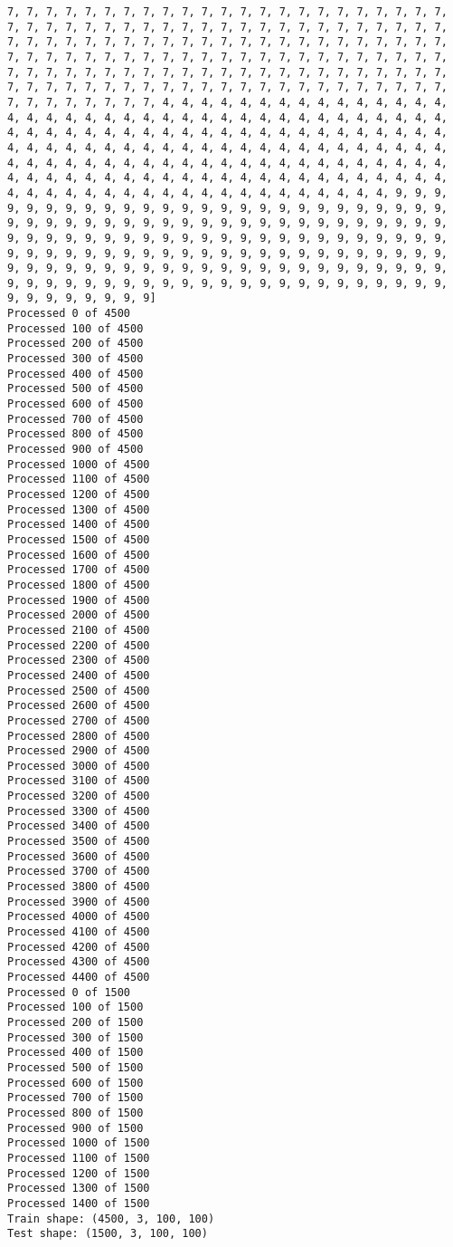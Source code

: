 \documentclass[11pt]{article}
\begin{document}
\begin{Verbatim}[commandchars=\\\{\}]
7, 7, 7, 7, 7, 7, 7, 7, 7, 7, 7, 7, 7, 7, 7, 7, 7, 7, 7, 7, 7, 7, 7, 7, 7, 7, 7, 7, 7, 7, 7, 7, 7, 7, 7, 7, 7, 7, 7, 7, 7, 7, 7, 7, 7, 7, 7, 7, 7, 7, 7, 7, 7, 7, 7, 7, 7, 7, 7, 7, 7, 7, 7, 7, 7, 7, 7, 7, 7, 7, 7, 7, 7, 7, 7, 7, 7, 7, 7, 7, 7, 7, 7, 7, 7, 7, 7, 7, 7, 7, 7, 7, 7, 7, 7, 7, 7, 7, 7, 7, 7, 7, 7, 7, 7, 7, 7, 7, 7, 7, 7, 7, 7, 7, 7, 7, 7, 7, 7, 7, 7, 7, 7, 7, 7, 7, 7, 7, 7, 7, 7, 7, 7, 7, 7, 7, 7, 7, 7, 7, 7, 7, 7, 7, 7, 7, 4, 4, 4, 4, 4, 4, 4, 4, 4, 4, 4, 4, 4, 4, 4, 4, 4, 4, 4, 4, 4, 4, 4, 4, 4, 4, 4, 4, 4, 4, 4, 4, 4, 4, 4, 4, 4, 4, 4, 4, 4, 4, 4, 4, 4, 4, 4, 4, 4, 4, 4, 4, 4, 4, 4, 4, 4, 4, 4, 4, 4, 4, 4, 4, 4, 4, 4, 4, 4, 4, 4, 4, 4, 4, 4, 4, 4, 4, 4, 4, 4, 4, 4, 4, 4, 4, 4, 4, 4, 4, 4, 4, 4, 4, 4, 4, 4, 4, 4, 4, 4, 4, 4, 4, 4, 4, 4, 4, 4, 4, 4, 4, 4, 4, 4, 4, 4, 4, 4, 4, 4, 4, 4, 4, 4, 4, 4, 4, 4, 4, 4, 4, 4, 4, 4, 4, 4, 4, 4, 4, 4, 4, 4, 4, 4, 4, 4, 4, 4, 4, 9, 9, 9, 9, 9, 9, 9, 9, 9, 9, 9, 9, 9, 9, 9, 9, 9, 9, 9, 9, 9, 9, 9, 9, 9, 9, 9, 9, 9, 9, 9, 9, 9, 9, 9, 9, 9, 9, 9, 9, 9, 9, 9, 9, 9, 9, 9, 9, 9, 9, 9, 9, 9, 9, 9, 9, 9, 9, 9, 9, 9, 9, 9, 9, 9, 9, 9, 9, 9, 9, 9, 9, 9, 9, 9, 9, 9, 9, 9, 9, 9, 9, 9, 9, 9, 9, 9, 9, 9, 9, 9, 9, 9, 9, 9, 9, 9, 9, 9, 9, 9, 9, 9, 9, 9, 9, 9, 9, 9, 9, 9, 9, 9, 9, 9, 9, 9, 9, 9, 9, 9, 9, 9, 9, 9, 9, 9, 9, 9, 9, 9, 9, 9, 9, 9, 9, 9, 9, 9, 9, 9, 9, 9, 9, 9, 9, 9, 9, 9]
Processed 0 of 4500
Processed 100 of 4500
Processed 200 of 4500
Processed 300 of 4500
Processed 400 of 4500
Processed 500 of 4500
Processed 600 of 4500
Processed 700 of 4500
Processed 800 of 4500
Processed 900 of 4500
Processed 1000 of 4500
Processed 1100 of 4500
Processed 1200 of 4500
Processed 1300 of 4500
Processed 1400 of 4500
Processed 1500 of 4500
Processed 1600 of 4500
Processed 1700 of 4500
Processed 1800 of 4500
Processed 1900 of 4500
Processed 2000 of 4500
Processed 2100 of 4500
Processed 2200 of 4500
Processed 2300 of 4500
Processed 2400 of 4500
Processed 2500 of 4500
Processed 2600 of 4500
Processed 2700 of 4500
Processed 2800 of 4500
Processed 2900 of 4500
Processed 3000 of 4500
Processed 3100 of 4500
Processed 3200 of 4500
Processed 3300 of 4500
Processed 3400 of 4500
Processed 3500 of 4500
Processed 3600 of 4500
Processed 3700 of 4500
Processed 3800 of 4500
Processed 3900 of 4500
Processed 4000 of 4500
Processed 4100 of 4500
Processed 4200 of 4500
Processed 4300 of 4500
Processed 4400 of 4500
Processed 0 of 1500
Processed 100 of 1500
Processed 200 of 1500
Processed 300 of 1500
Processed 400 of 1500
Processed 500 of 1500
Processed 600 of 1500
Processed 700 of 1500
Processed 800 of 1500
Processed 900 of 1500
Processed 1000 of 1500
Processed 1100 of 1500
Processed 1200 of 1500
Processed 1300 of 1500
Processed 1400 of 1500
Train shape: (4500, 3, 100, 100)
Test shape: (1500, 3, 100, 100)

    \end{Verbatim}
\end{document}
